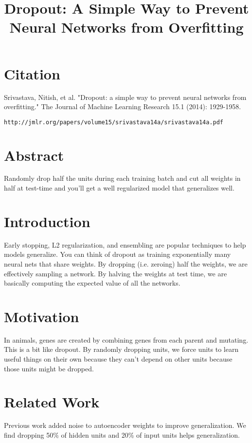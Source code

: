 \documentclass[a4paper]{article}
\title{Dropout: A Simple Way to Prevent Neural Networks from Overfitting}
\date{}
\begin{document}
\maketitle

\section{Citation}
Srivastava, Nitish, et al. "Dropout: a simple way to prevent neural networks from overfitting." The Journal of Machine Learning Research 15.1 (2014): 1929-1958.

\begin{verbatim}
http://jmlr.org/papers/volume15/srivastava14a/srivastava14a.pdf
\end{verbatim}

\section{Abstract}
Randomly drop half the units during each training batch and cut all weights in
half at test-time and you'll get a well regularized model that generalizes well.

\section{Introduction}
Early stopping, L2 regularization, and ensembling are popular techniques to
help models generalize. You can think of dropout as training exponentially
many neural nets that share weights. By dropping (i.e. zeroing) half the
weights, we are effectively sampling a network. By halving the weights at test
time, we are basically computing the expected value of all the networks.

\section{Motivation}
In animals, genes are created by combining genes from each parent and mutating.
This is a bit like dropout. By randomly dropping units, we force units to learn
useful things on their own because they can't depend on other units because
those units might be dropped.

\section{Related Work}
Previous work added noise to autoencoder weights to improve generalization. We
find dropping 50\% of hidden units and 20\% of input units helps generalization.
\end{document}
